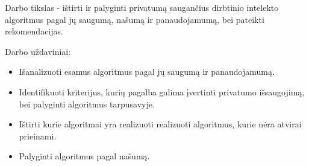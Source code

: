 \documentclass{VUMIFInfBakalaurinis}
\begin{document}
	\par Darbo tikslas - ištirti ir palyginti privatumą saugančius dirbtinio intelekto algoritmus pagal jų saugumą, našumą ir panaudojamumą, bei pateikti rekomendacijas.
	\par Darbo uždaviniai:
	\begin{itemize}
		\item Išanalizuoti esamus algoritmus pagal jų saugumą ir panaudojamumą.
		\item Identifikuoti kriterijus, kurių pagalba galima įvertinti privatumo išsaugojimą, bei palyginti algoritmus tarpusavyje.
		\item Ištirti kurie algoritmai yra realizuoti realizuoti algoritmus, kurie nėra atvirai prieinami.
		\item Palyginti algoritmus pagal našumą.
	\end{itemize}
\end{document}
